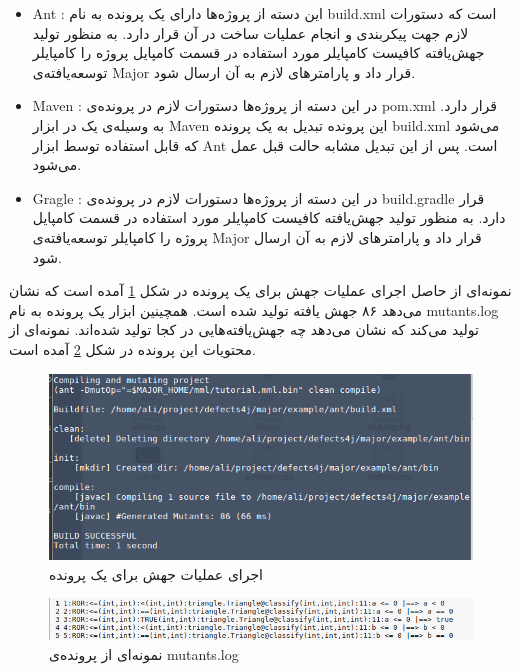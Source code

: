 \begin{enumerate}
\begin{itemize}
	\item
	Ant : 
	این دسته از پروژه‌ها دارای یک پرونده به نام build.xml است که دستورات لازم جهت پیکربندی و انجام عملیات ساخت در آن قرار دارد. به منظور تولید جهش‌یافته کافیست کامپایلر مورد استفاده در قسمت کامپایل پروژه را کامپایلر توسعه‌یافته‌ی Major قرار داد و پارامترهای لازم به آن ارسال شود. 
	\item Maven : 
	در این دسته از پروژه‌ها دستورات لازم در پرونده‌ی pom.xml قرار دارد.  به وسیله‌ی  یک  در ابزار Maven این پرونده تبدیل به یک پرونده build.xml می‌شود که قابل استفاده توسط ابزار Ant است. پس از این تبدیل مشابه حالت قبل عمل می‌شود. 	
	\item Gragle : 
	در این دسته از پروژه‌ها دستورات لازم در پرونده‌ی  build.gradle قرار دارد.  به منظور تولید جهش‌یافته کافیست کامپایلر مورد استفاده در قسمت کامپایل پروژه را کامپایلر توسعه‌یافته‌ی Major قرار داد و پارامترهای لازم به آن ارسال شود. 
\end{itemize}

نمونه‌ای از حاصل اجرای  عملیات جهش برای یک پرونده در شکل \ref{fig:major-mutant}  آمده است   که نشان می‌دهد ۸۶ جهش یافته تولید شده است. همچینین ابزار یک پرونده به نام mutants.log تولید می‌کند که نشان می‌دهد چه جهش‌یافته‌هایی در کجا تولید شده‌اند. نمونه‌ای از محتویات این پرونده در شکل \ref{fig:major-log}  آمده است. 

\begin{figure}[H]
	\centering
	\includegraphics[width=.8\textwidth]{img/case_study/major-mutant.png}
	\caption{اجرای عملیات جهش برای یک پرونده}
	\label{fig:major-mutant}
\end{figure}

\begin{figure}[H]
	\centering
	\includegraphics[width=\textwidth]{img/case_study/major-log.png}
	\caption{نمونه‌ای از پرونده‌ی mutants.log}
	\label{fig:major-log}
\end{figure}


\end{enumerate}
